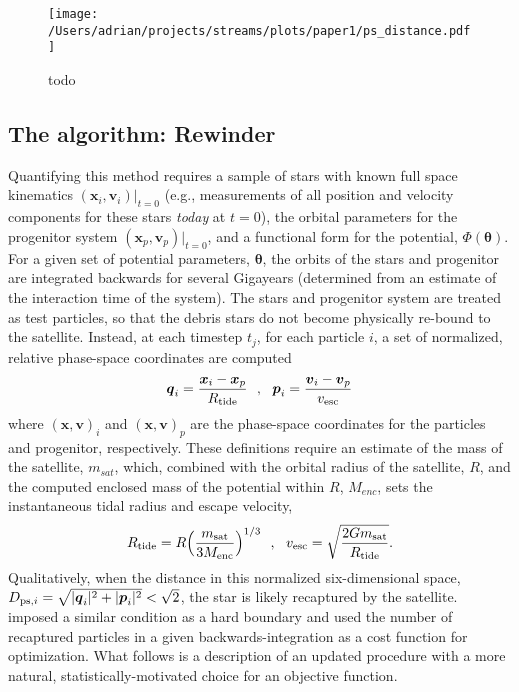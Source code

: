 \documentclass{emulateapj}
\newcommand{\bs}{\boldsymbol}
\begin{document}
\begin{figure}[h]
\begin{center}
\texttt{[image: /Users/adrian/projects/streams/plots/paper1/ps\_distance.pdf]}
\caption{ todo }\label{fig:ps_distance}
\end{center}
\end{figure}

\subsection{The algorithm: Rewinder}
Quantifying this method requires a sample of stars with known full
space kinematics $(\bs{x}_{i}, \bs{v}_{i})|_{t=0}$ (e.g., measurements
of all position and velocity components for these stars \emph{today}
at $t=0$), the orbital parameters for the progenitor system
$(\bs{x}_p, \bs{v}_p)|_{t=0}$, and a functional form for the
potential, $\Phi({\boldsymbol\theta})$. For a given set of potential
parameters, $\boldsymbol\theta$, the orbits of the stars and
progenitor are integrated backwards for several Gigayears (determined
from an estimate of the interaction time of the system). The stars and
progenitor system are treated as test particles, so that the debris
stars do not become physically re-bound to the satellite. Instead, at
each timestep $t_j$, for each particle $i$, a set of normalized,
relative phase-space coordinates are computed
\begin{equation}
  \bs{q}_{i} = \frac{\bs{x}_{i} -
    \bs{x}_{p}}{R_{\rm tide}}\,\,\,\,,\,\,\,\,\bs{p}_{i} = \frac{\bs{v}_{i} -
    \bs{v}_{p}}{v_{\rm esc}}
\end{equation}
where $(\bs{x},\bs{v})_{i}$ and $(\bs{x},\bs{v})_{p}$ are the
phase-space coordinates for the particles and progenitor,
respectively. These definitions require an estimate of the mass of the
satellite, $m_{sat}$, which, combined with the orbital radius of the
satellite, $R$, and the computed enclosed mass of the potential within
$R$, $M_{enc}$, sets the instantaneous tidal radius and escape
velocity,
\begin{equation}
  R_{\rm tide}=R\Big(\frac{m_{\rm sat}}{3M_{\rm enc}}\Big)^{1/3}\,\,\,\,,\,\,\,\,
  v_{\rm esc}=\sqrt{\frac{2Gm_{\rm sat}}{R_{\rm tide}}}.
\end{equation}
Qualitatively, when the distance in this normalized six-dimensional
space, $D_{{\rm ps},i}=\sqrt{|\bs{q}_{i}|^2+|\bs{p}_{i}|^2} <
\sqrt{2}$, the star is likely recaptured by the
satellite. \citet{johnston99a} imposed a similar
condition as a hard boundary and used the number of recaptured
particles in a given backwards-integration as a cost function for
optimization. What follows is a description of an updated procedure
with a more natural, statistically-motivated choice for an objective
function.
\end{document}
